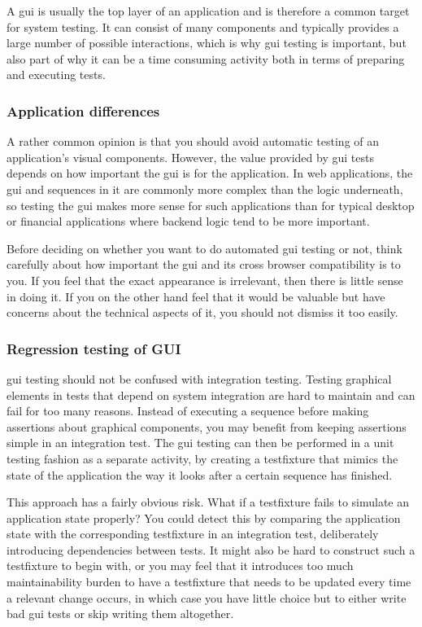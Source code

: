 \documentclass[11pt]{article}
\begin{document}
A \acrfull{gui} is usually the top layer of an application and is therefore a common target for system testing. It can consist of many components and typically provides a large number of possible interactions, which is why \gls{gui} testing is important, but also part of why it can be a time consuming activity both in terms of preparing and executing tests.

\subsubsection{Application differences}

A rather common opinion is that you should avoid automatic testing of an application's visual components. However, the value provided by \gls{gui} tests depends on how important the \gls{gui} is for the application. In web applications, the \gls{gui} and sequences in it are commonly more complex than the logic underneath, so testing the \gls{gui} makes more sense for such applications than for typical desktop or financial applications where backend logic tend to be more important. \cite[question~21]{Ahnve}

Before deciding on whether you want to do automated \gls{gui} testing or not, think carefully about how important the \gls{gui} and its cross browser compatibility is to you. If you feel that the exact appearance is irrelevant, then there is little sense in doing it. If you on the other hand feel that it would be valuable but have concerns about the technical aspects of it, you should not dismiss it too easily.

\subsubsection{Regression testing of GUI}

\gls{gui} testing should not be confused with integration testing. Testing graphical elements in tests that depend on system integration are hard to maintain and can fail for too many reasons. Instead of executing a sequence before making assertions about graphical components, you may benefit from keeping assertions simple in an integration test. The \gls{gui} testing can then be performed in a unit testing fashion as a separate activity, by creating a \gls{testfixture} that mimics the state of the application the way it looks after a certain sequence has finished.

This approach has a fairly obvious risk. What if a \gls{testfixture} fails to simulate an application state properly? You could detect this by comparing the application state with the corresponding \gls{testfixture} in an integration test, deliberately introducing dependencies between tests. It might also be hard to construct such a \gls{testfixture} to begin with, or you may feel that it introduces too much maintainability burden to have a \gls{testfixture} that needs to be updated every time a relevant change occurs, in which case you have little choice but to either write bad \gls{gui} tests or skip writing them altogether.
\end{document}
